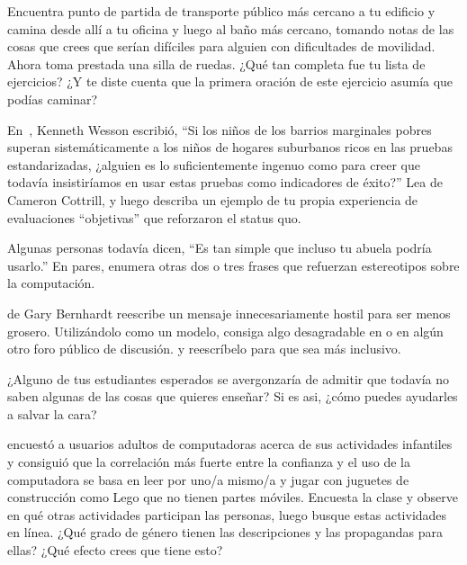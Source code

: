 
Encuentra punto de partida de transporte público más cercano a tu edificio
y camina desde allí a tu oficina y luego al baño más cercano,
tomando notas de las cosas que crees que serían difíciles para alguien con dificultades de movilidad.
Ahora toma prestada una silla de ruedas.
¿Qué tan completa fue tu lista de ejercicios?
¿Y te diste cuenta que la primera oración de este ejercicio asumía que podías caminar?


En~\cite{Litt2004},
Kenneth Wesson escribió,
``Si los niños de los barrios marginales pobres superan sistemáticamente a los niños de hogares suburbanos ricos en las pruebas estandarizadas,
¿alguien es lo suficientemente ingenuo como para creer que todavía insistiríamos en usar estas pruebas como indicadores de éxito?''
Lea 
de Cameron Cottrill,
y luego describa un ejemplo de tu propia experiencia de evaluaciones ``objetivas'' que reforzaron el status quo.


Algunas personas todavía dicen, ``Es tan simple que incluso tu abuela podría usarlo.''
En pares,
enumera otras dos o tres frases que refuerzan estereotipos sobre la computación.



de Gary Bernhardt
reescribe un mensaje innecesariamente hostil para ser menos grosero.
Utilizándolo como un modelo,
consiga algo desagradable en  o en algún otro foro público de discusión.
y reescríbelo para que sea más inclusivo.


¿Alguno de tus estudiantes esperados se avergonzaría de admitir que
todavía no saben algunas de las cosas que quieres enseñar?
Si es asi,
¿cómo puedes ayudarles a salvar la cara?


\cite{Cutt2017} encuestó a usuarios adultos de computadoras acerca de sus actividades infantiles
y consiguió que la correlación más fuerte entre la confianza y el uso de la computadora
se basa en leer por uno/a mismo/a y jugar con juguetes de construcción como Lego que no tienen partes móviles.
Encuesta la clase y observe en qué otras actividades participan las personas,
luego busque estas actividades en línea.
¿Qué grado de género tienen las descripciones y las propagandas para ellas?
¿Qué efecto crees que tiene esto?

